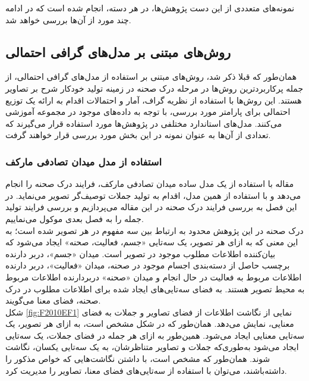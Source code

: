نمونه‌های متعددی از این دست پژوهش‌ها، در هر دسته، انجام شده است که در ادامه چند مورد از آن‌ها بررسی خواهد شد.

\subsection{روش‌های مبتنی بر مدل‌های گرافی احتمالی}

همان‌طور که قبلا ذکر شد، روش‌های مبتنی بر استفاده از مدل‌های گرافی احتمالی، از جمله پرکاربردترین روش‌ها در مرحله درک صحنه در زمینه تولید خودکار شرح بر تصاویر هستند. این روش‌ها با استفاده از نظریه گراف، آمار و احتمالات اقدام به ارائه یک توزیع احتمالی برای پارامتر مورد بررسی، با توجه به داده‌های موجود در مجموعه آموزشی می‌کنند. مدل‌های استاندارد مختلفی در پژوهش‌ها مورد استفاده قرار می‌گیرند که تعدادی از آن‌ها به عنوان نمونه در این بخش مورد بررسی قرار خواهند گرفت.
\subsubsection[استفاده از مدل میدان تصادفی مارکف]{استفاده از مدل میدان تصادفی مارکف\cite{Farhadi2010every}}
مقاله
\cite{Farhadi2010every}
با استفاده از یک مدل ساده میدان تصادفی مارکف، فرایند درک صحنه را انجام می‌دهد و با استفاده از همین مدل، اقدام به تولید جملات توصیف‌گر تصویر می‌نماید. در این فصل به بررسی فرایند درک صحنه در این مقاله می‌پردازیم و بررسی فرایند تولید جمله را به فصل بعدی موکول می‌نماییم.
\\
درک صحنه در این پژوهش محدود به ارتباط بین سه مفهوم در هر تصویر شده است؛ به این معنی که به ازای هر تصویر، یک سه‌تایی «جسم، فعالیت، صحنه»
ایجاد می‌شود که بیان‌کننده اطلاعات مطلوب موجود در تصویر است. میدان «جسم»، دربر دارنده‌ برچسب حاصل از دسته‌بندی اجسام موجود در صحنه، میدان «فعالیت»، دربر دارنده اطلاعات مربوط به فعالیت در حال انجام و میدان «صحنه» دربردارنده اطلاعات مربوط به محیط تصویر هستند. به فضای سه‌تایی‌های ایجاد شده برای اطلاعات مطلوب در درک صحنه، فضای معنا می‌گویند.
\\
شکل
\ref{fig:F2010EF1}
نمایی از نگاشت اطلاعات از فضای تصاویر و جملات به فضای معنایی، نمایش می‌دهد. همان‌طور که در شکل مشخص است، به ازای هر تصویر، یک سه‌تایی معنایی ایجاد می‌شود. همین‌طور به ازای هر جمله در فضای جملات، یک سه‌تایی ایجاد می‌شود به‌طوری‌که جملات و تصاویر متناظرشان، به یک سه‌تایی یکسان، نگاشت شوند. همان‌طور که مشخص است، با داشتن نگاشت‌هایی  که خواص مذکور را داشته‌باشند، می‌توان با استفاده از سه‌تایی‌های فضای معنا، تصاویر را مدیریت کرد.

